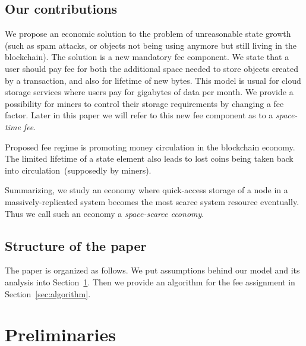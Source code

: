 \documentclass[]{llncs}   %
\newcommand{\authnote}[2]{\marginpar{\parbox{\marginparwidth}{\tiny %
  \textsf{#1 {\textcolor{blue}{notes: #2}}}}}%
  \textcolor{blue}{\textbf{\dag}}}
\newcommand{\authnote}[2]{
  \textsf{#1\textcolor{blue}{ #2}}}
\newcommand{\authnote}[2]{}
\newcommand{\knote}[1]{{\authnote{\textcolor{green}{Alex notes:}}{#1}}}
\begin{document}
\subsection{Our contributions}

We propose an economic solution to the problem of unreasonable state growth
(such as spam attacks, or objects not being using anymore but still living in
the blockchain). The solution is a new mandatory fee component. We state that a
user should pay fee for both the additional space needed to store objects
created by a transaction, and also for lifetime of new bytes. This model is
usual for cloud storage services where users pay for gigabytes of data per
month. We provide a possibility for miners to control their storage requirements
by changing a fee factor. Later in this paper we will refer to this new fee
component as to a {\em space-time fee}.

\knote{write abt fee adjustment rule}

Proposed fee regime is promoting money circulation in the blockchain economy.
The limited lifetime of a state element also leads to lost coins being taken
back into circulation~(supposedly by miners). 

Summarizing, we study an economy where quick-access storage of a node in a
massively-replicated system becomes the most scarce system resource eventually.
Thus we call such an economy a {\em space-scarce economy}.

\subsection{Structure of the paper}
The paper is organized as follows. We put assumptions behind our model and its analysis into Section~\ref{sec:preliminaries}. Then we provide an algorithm for the fee assignment in Section~\ref{sec:algorithm}. \knote{todo: finish}


\section{Preliminaries}
\label{sec:preliminaries}
\end{document}
